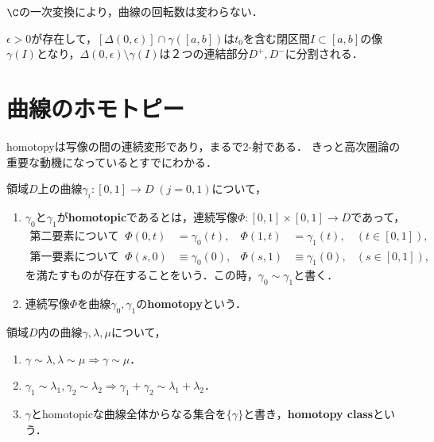\documentclass[uplatex, dvipdfmx]{jsreport}
\begin{document}
\begin{lemma}
    $\C$の一次変換により，曲線の回転数は変わらない．
\end{lemma}
\begin{lemma}
    $\epsilon>0$が存在して，$[\Delta(0,\epsilon)]\cap\gamma([a,b])$は$t_0$を含む閉区間$I\subset[a,b]$の像$\gamma(I)$となり，$\Delta(0,\epsilon)\setminus\gamma(I)$は２つの連結部分$D^+,D^-$に分割される．
\end{lemma}

\section{曲線のホモトピー}

\begin{screen}
    homotopyは写像の間の連続変形であり，まるで2-射である．
    きっと高次圏論の重要な動機になっているとすでにわかる．
\end{screen}

\begin{definition}[homotopy]
    領域$D$上の曲線$\gamma_i:[0,1]\to D\;(j=0,1)$について，
    \begin{enumerate}
        \item $\gamma_0$と$\gamma_1$が\textbf{homotopic}であるとは，連続写像$\Phi:[0,1]\times[0,1]\to D$であって，
        \begin{align*}
            第二要素について\;\;\Phi(0,t)&=\gamma_0(t),&\Phi(1,t)&=\gamma_1(t),&(t\in[0,1]),\\
            第一要素について\;\;\Phi(s,0)&\equiv\gamma_0(0),&\Phi(s,1)&\equiv\gamma_1(0),&(s\in[0,1]),
        \end{align*}
        を満たすものが存在することをいう．この時，$\gamma_0\sim\gamma_1$と書く．
        \item 連続写像$\Phi$を曲線$\gamma_0,\gamma_1$の\textbf{homotopy}という．
    \end{enumerate}
\end{definition}

\begin{lemma}[homotopicは同値類を定める]
    領域$D$内の曲線$\gamma,\lambda,\mu$について，
    \begin{enumerate}
        \item $\gamma\sim\lambda,\lambda\sim\mu\Rightarrow\gamma\sim\mu$．
        \item $\gamma_1\sim\lambda_1,\gamma_2\sim\lambda_2\Rightarrow\gamma_1+\gamma_2\sim\lambda_1+\lambda_2$．
        \item $\gamma$とhomotopicな曲線全体からなる集合を$\{\gamma\}$と書き，\textbf{homotopy class}という．
    \end{enumerate}
\end{lemma}
\end{document}
